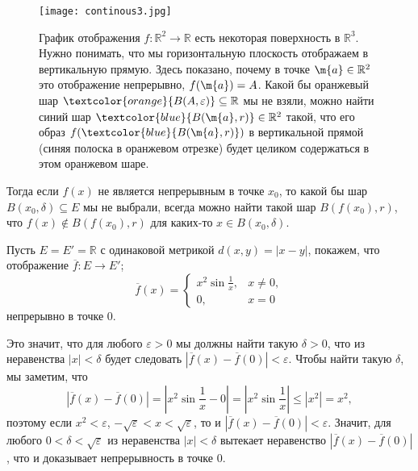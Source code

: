 \begin{figure}[h!]
    \centering
    \texttt{[image: continous3.jpg]}
    \caption{График отображения $f: \mathbb{R}^2 \to \mathbb{R}$ есть некоторая поверхность в $\mathbb{R}^3$. Нужно понимать, что мы горизонтальную плоскость отображаем в вертикальную прямую. Здесь показано, почему в точке $\m{a}\in \mathbb{R}^2$ это отображение непрерывно, $f(\m{a}) = A$. Какой бы оранжевый шар $\textcolor{orange}{B(A, \varepsilon)} \subseteq \mathbb{R}$ мы не взяли, можно найти синий шар $\textcolor{blue}{B(\m{a},r)} \in \mathbb{R}^2$ такой, что его образ $f( \textcolor{blue}{B(\m{a}, r)} )$ в вертикальной прямой (синяя полоска в оранжевом отрезке) будет целиком содержаться в этом оранжевом шаре.}
    \label{fig:enter-label}
\end{figure}


\begin{remark}\label{not_continous}
    Тогда если $f(x)$ не является непрерывным в точке $x_0$, то какой бы шар $B(x_0, \delta) \subseteq E$ мы не выбрали, всегда можно найти такой шар $B(f(x_0),r)$, что $f(x) \notin B(f(x_0),r)$ для каких-то $x \in B(x_0, \delta).$
\end{remark}


\begin{example}\label{x^2sin(1x)}
    Пусть $E = E' = \mathbb{R}$ с одинаковой метрикой $d(x,y) = |x-y|$, покажем, что отображение $\overline{f}:E \to E'$;
    \[
     \overline{f}(x) = \begin{cases}
         x^2 \sin \frac{1}{x}, & x \ne 0, \\
         0, & x =0
     \end{cases}
    \]
    непрерывно в точке $0$.

    Это значит, что для любого $\varepsilon >0$ мы должны найти такую $\delta >0$, что из неравенства $|x|<\delta$ будет следовать $|\overline{f}(x) - \overline{f}(0)| <\varepsilon.$ Чтобы найти такую $\delta$, мы заметим, что 
    \[
    \left|\overline{f}(x) -\overline{f}(0)\right| = \left|x^2 \sin \frac{1}{x} - 0 \right| = \left|x^2 \sin \frac{1}{x}\right| \le |x^2| = x^2,
    \]
поэтому если $x^2 <\varepsilon$, \ie $-\sqrt{ \varepsilon} <x < \sqrt{\varepsilon}$, то и $|\overline{f}(x) - \overline{f}(0)| <\varepsilon$. Значит, для любого $0 < \delta < \sqrt{\varepsilon}$ из неравенства $|x|<\delta$ вытекает неравенство $|\overline{f}(x) - \overline{f}(0)|$, что и доказывает непрерывность в точке $0.$
\end{example}

